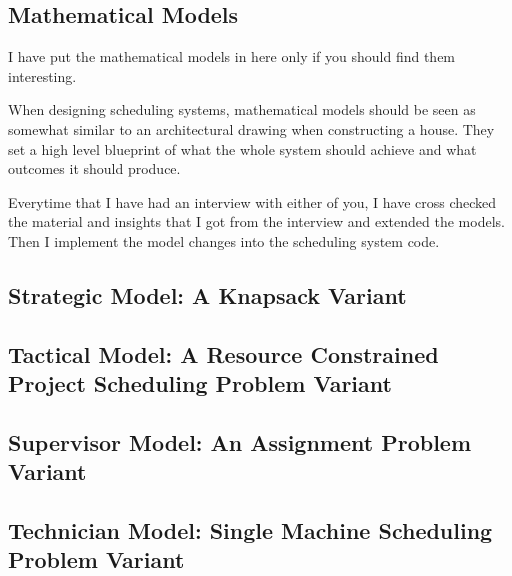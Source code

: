 \newpage
\subsection{Mathematical Models}
I have put the mathematical models in here only if you should find them interesting. 

When designing scheduling systems, mathematical models should be seen as somewhat similar 
to an architectural drawing when constructing a house. They set a high level blueprint of what
the whole system should achieve and what outcomes it should produce. 

Everytime that I have had an interview with either 
of you, I have cross checked the material and insights that I got from the interview 
and extended the models. Then I implement the model changes into the scheduling system code.

\subsection{Strategic Model: A Knapsack Variant}
\label{sec:model:strategic}

\strategicmodel
\newpage
\subsection{Tactical Model: A Resource Constrained Project Scheduling Problem Variant}
\label{sec:model:tactical}

\newpage
\subsection{Supervisor Model: An Assignment Problem Variant}
\label{sec:model:supervisor}

\newpage
\subsection{Technician Model: Single Machine Scheduling Problem Variant}
\label{sec:model:technician}


